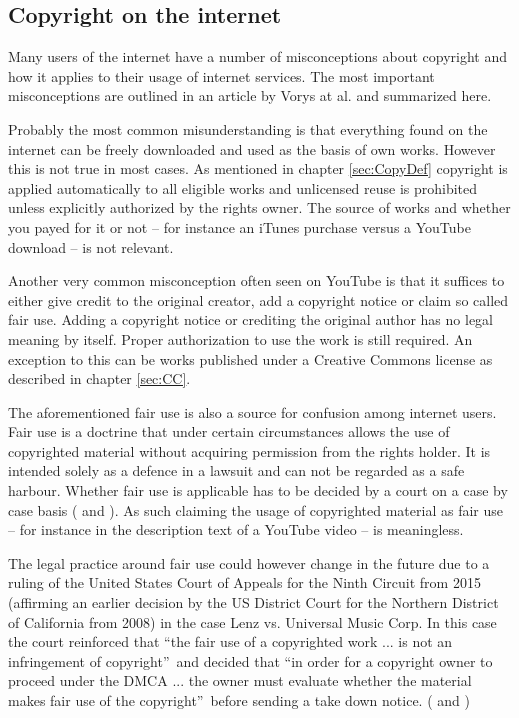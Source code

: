 \documentclass[a4paper]{report}
\begin{document}
\subsection{Copyright on the internet}
Many users of the internet have a number of misconceptions about copyright and how it applies to their usage of internet services. The most important misconceptions are outlined in an article by Vorys at al. \parencite{Vorys2013} and summarized here.

Probably the most common misunderstanding is that everything found on the internet can be freely downloaded and used as the basis of own works. However this is not true in most cases. As mentioned in chapter \ref{sec:CopyDef} copyright is applied automatically to all eligible works and unlicensed reuse is prohibited unless explicitly authorized by the rights owner. The source of works and whether you payed for it or not -- for instance an iTunes purchase versus a YouTube download -- is not relevant.

Another very common misconception often seen on YouTube is that it suffices to either give credit to the original creator, add a copyright notice or claim so called fair use. \parencite{Vorys2013} Adding a copyright notice or crediting the original author has no legal meaning by itself. Proper authorization to use the work is still required. An exception to this can be works published under a Creative Commons license as described in chapter \ref{sec:CC}.

The aforementioned fair use is also a source for confusion among internet users. Fair use is a doctrine that under certain circumstances allows the use of copyrighted material without acquiring permission from the rights holder. It is intended solely as a defence in a lawsuit and can not be regarded as a safe harbour. Whether fair use is applicable has to be decided by a court on a case by case basis (\cite{WikiFair} and \cite{Vorys2013}). As such claiming the usage of copyrighted material as fair use -- for instance in the description text of a YouTube video -- is meaningless.

The legal practice around fair use could however change in the future due to a ruling of the United States Court of Appeals for the Ninth Circuit from 2015 (affirming an earlier decision by the US District Court for the Northern District of California from 2008) in the case Lenz vs. Universal Music Corp. In this case the court reinforced that \textquotedblleft the fair use of a copyrighted work ... is not an infringement of copyright\textquotedblright\ and decided that \textquotedblleft in order for a copyright owner to proceed under the DMCA ... the owner must evaluate whether the material makes fair use of the copyright\textquotedblright\ before sending a take down notice. (\cite{LenzUniversal} and \cite{WikiLenzUniversal})
\end{document}
